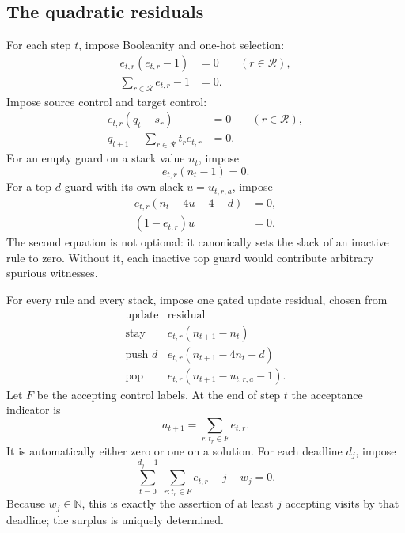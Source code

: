 \documentclass[11pt,letterpaper]{article}
\theoremstyle{definition}
\theoremstyle{remark}
\newcommand{\N}{\mathbb N}
\newcommand{\rules}{\mathcal R}
\newcommand{\1}{\mathbf 1}
\begin{document}
\subsection{The quadratic residuals}
For each step $t$, impose Booleanity and one-hot selection:
\begin{align}
 e_{t,r}(e_{t,r}-1)&=0 &&(r\in\rules),\label{lbh:eq:boolean}\\
 \sum_{r\in\rules}e_{t,r}-1&=0.\label{lbh:eq:onehot}
\end{align}
Impose source control and target control:
\begin{align}
 e_{t,r}(q_t-s_r)&=0 &&(r\in\rules),\label{lbh:eq:source}\\
 q_{t+1}-\sum_{r\in\rules}t_r e_{t,r}&=0.\label{lbh:eq:target}
\end{align}
For an empty guard on a stack value $n_t$, impose
\begin{equation}\label{lbh:eq:empty}
 e_{t,r}(n_t-1)=0.
\end{equation}
For a top-$d$ guard with its own slack $u=u_{t,r,a}$, impose
\begin{align}
 e_{t,r}(n_t-4u-4-d)&=0,\label{lbh:eq:top}\\
 (1-e_{t,r})u&=0.\label{lbh:eq:inactive}
\end{align}
The second equation is not optional: it canonically sets the slack of an
inactive rule to zero. Without it, each inactive top guard would contribute
arbitrary spurious witnesses.

For every rule and every stack, impose one gated update residual, chosen
from
\begin{equation}\label{lbh:eq:updates}
 \begin{array}{c|l}
 \text{update}&\text{residual}\\ \hline
 \text{stay}&e_{t,r}(n_{t+1}-n_t)\\
 \text{push }d&e_{t,r}(n_{t+1}-4n_t-d)\\
 \text{pop}&e_{t,r}(n_{t+1}-u_{t,r,a}-1).
 \end{array}
\end{equation}
Let $F$ be the accepting control labels. At the end of step $t$ the
acceptance indicator is
\[
 a_{t+1}=\sum_{r:t_r\in F}e_{t,r}.
\]
It is automatically either zero or one on a solution. For each deadline
$d_j$, impose
\begin{equation}\label{lbh:eq:deadline-residual}
 \sum_{t=0}^{d_j-1}\ \sum_{r:t_r\in F}e_{t,r}-j-w_j=0.
\end{equation}
Because $w_j\in\N$, this is exactly the assertion of at least $j$ accepting
visits by that deadline; the surplus is uniquely determined.
\end{document}

